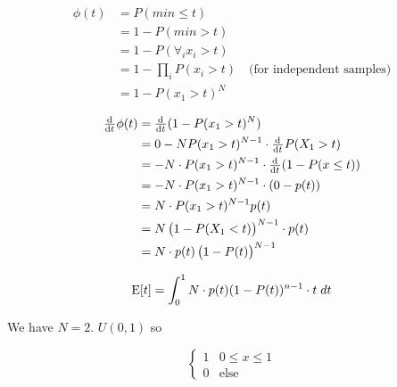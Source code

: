 \documentclass{article}
\begin{document}
\begin{align*}
  \phi(t) &= P(min \le t) \\
          &= 1 - P(min > t) \\
          &= 1 - P(\forall_ix_i > t) \\
          &= 1 - \prod_i P(x_i > t) \quad \text{(for independent
            samples)} \\
          &= 1 - P(x_1 > t)^N
\end{align*}

\begin{align*}
  \od{}{t} \phi(t) &= \od{}{t}(1 - P(x_1>t)^N) \\
                   &= 0 - NP(x_1>t)^{N-1} \cdot \od{}{t} P(X_1>t) \\
                   &= -N \cdot P(x_1>t)^{N-1} \cdot \od{}{t}(1-P(x \le t)) \\
                   &= -N \cdot P(x_1 > t)^{N-1} \cdot (0 - p(t)) \\
                   &= N \cdot P(x_1 > t)^{N-1} p(t) \\
                   &= N \left(1 - P(X_1 < t) \right)^{N-1} \cdot p(t) \\
                   &= N \cdot p(t) \left( 1 - P(t)\right)^{N-1}
\end{align*}


\[ \mathrm{E}[t] = \int_0^1 N \cdot p(t) (1-P(t))^{n-1} \cdot t \; dt \\ \]

We have $N = 2$. $U(0,1)$ so

\[

\left\{
  \begin{array}{ll}
    1 & 0 \le x \le 1 \\
    0 & \text{else}
  \end{array}
\right.
\]
\end{document}
